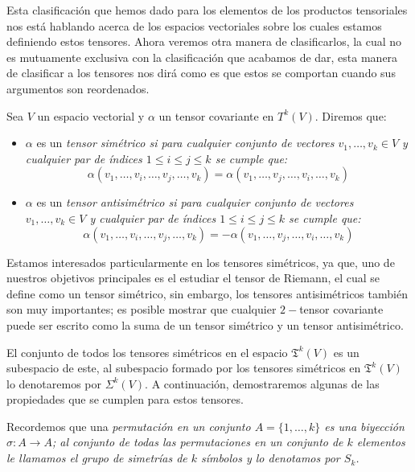 Esta clasificación que hemos dado para los elementos de los productos tensoriales
nos está hablando acerca de los espacios vectoriales sobre los cuales estamos
definiendo estos tensores. Ahora veremos otra manera de clasificarlos, la cual
no es mutuamente exclusiva con la clasificación que acabamos de dar, esta
manera de clasificar a los tensores nos dirá como es que estos se comportan
cuando sus argumentos son reordenados.

\begin{definition}
	Sea $V$ un espacio vectorial y $\alpha$ un tensor covariante en $T^{k}(V)$.
	Diremos que:
	\begin{itemize}
		\item $\alpha$ es un \it{tensor simétrico} si para cualquier conjunto de
		      vectores $v_1, \ldots, v_k \in V$ y cualquier par de índices $1 \leq i
			      \leq j \leq k$ se cumple que:
		      \[
			      \alpha(v_1,\ldots,v_i,\ldots,v_j,\ldots,v_k) =
			      \alpha(v_1,\ldots,v_j,\ldots,v_i,\ldots,v_k)
		      \]
		\item $\alpha$ es un \it{tensor antisimétrico} si para cualquier conjunto de
		      vectores $v_1, \ldots, v_k \in V$ y cualquier par de índices $1 \leq i
			      \leq j \leq k$ se cumple que:
		      \[
			      \alpha(v_1,\ldots,v_i,\ldots,v_j,\ldots,v_k) =
			      -\alpha(v_1,\ldots,v_j,\ldots,v_i,\ldots,v_k)
		      \]
	\end{itemize}
\end{definition}

Estamos interesados particularmente en los tensores simétricos, ya que, uno de
nuestros objetivos principales es el estudiar el tensor de Riemann, el cual se
define como un tensor simétrico, sin embargo, los tensores antisimétricos
también son muy importantes; es posible mostrar que cualquier $2-$tensor
covariante puede ser escrito como la suma de un tensor simétrico y un tensor
antisimétrico.

El conjunto de todos los tensores simétricos en el espacio $\mathfrak{T}^{k}(V)$
es un subespacio de este, al subespacio formado por los tensores
simétricos en $\mathfrak{T}^{k}(V)$ lo denotaremos por $\Sigma^{k}(V)$. A
continuación, demostraremos algunas de las propiedades que se cumplen para estos 
tensores.

Recordemos que una \it{permutación} en un conjunto $A = \{1, \ldots, k\}$ es
una biyección $\sigma: A \to A$; al conjunto de todas las permutaciones
en un conjunto de $k$ elementos le llamamos el \it{grupo de simetrías de $k$
	símbolos} y lo denotamos por $S_k$.

